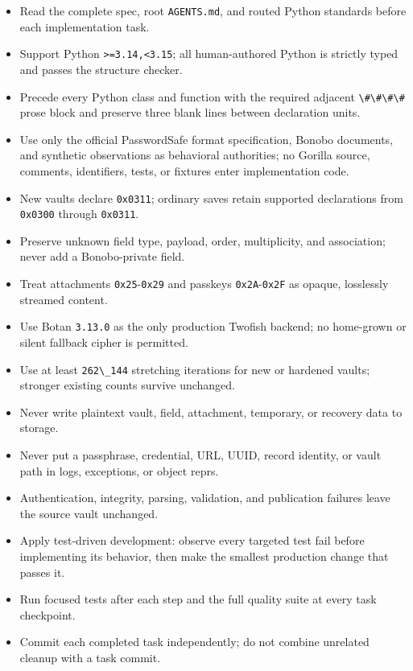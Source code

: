 \documentclass[
  letterpaper,
]{article}
\newcommand{\passthrough}[1]{#1}
\providecommand{\tightlist}{%
  \setlength{\itemsep}{0pt}\setlength{\parskip}{0pt}}
\begin{document}
\begin{itemize}
\tightlist
\item
  Read the complete spec, root \passthrough{\lstinline!AGENTS.md!}, and routed Python standards before each
  implementation task.
\item
  Support Python \nolinkurl{>=3.14,<3.15}; all human-authored Python is strictly typed and passes the structure checker.
\item
  Precede every Python class and function with the required adjacent \passthrough{\lstinline!\#\#\#\#!} prose block and
  preserve three blank lines between declaration units.
\item
  Use only the official PasswordSafe format specification, Bonobo documents, and synthetic observations as behavioral
  authorities; no Gorilla source, comments, identifiers, tests, or fixtures enter implementation code.
\item
  New vaults declare \passthrough{\lstinline!0x0311!}; ordinary saves retain supported declarations from
  \passthrough{\lstinline!0x0300!} through \passthrough{\lstinline!0x0311!}.
\item
  Preserve unknown field type, payload, order, multiplicity, and association; never add a Bonobo-private field.
\item
  Treat attachments \passthrough{\lstinline!0x25!}-\passthrough{\lstinline!0x29!} and passkeys
  \passthrough{\lstinline!0x2A!}-\passthrough{\lstinline!0x2F!} as opaque, losslessly streamed content.
\item
  Use Botan \passthrough{\lstinline!3.13.0!} as the only production Twofish backend; no home-grown or silent fallback
  cipher is permitted.
\item
  Use at least \passthrough{\lstinline!262\_144!} stretching iterations for new or hardened vaults; stronger existing
  counts survive unchanged.
\item
  Never write plaintext vault, field, attachment, temporary, or recovery data to storage.
\item
  Never put a passphrase, credential, URL, UUID, record identity, or vault path in logs, exceptions, or object reprs.
\item
  Authentication, integrity, parsing, validation, and publication failures leave the source vault unchanged.
\item
  Apply test-driven development: observe every targeted test fail before implementing its behavior, then make the
  smallest production change that passes it.
\item
  Run focused tests after each step and the full quality suite at every task checkpoint.
\item
  Commit each completed task independently; do not combine unrelated cleanup with a task commit.
\end{itemize}
\end{document}
